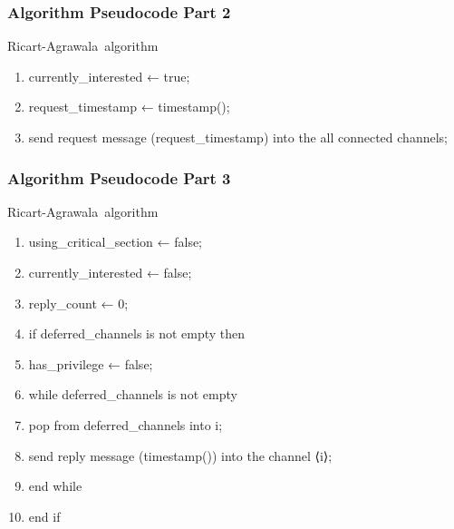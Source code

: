 \documentclass[11pt]{beamer}              %
\begin{document}
\begin{frame}
\frametitle{Algorithm Pseudocode Part 2}

\begin{center}
\begin{algorithm}[H]
	\scriptsize
	\def\algorithmlabel{Ricart-Agrawala}
    \caption{\algorithmlabel\ algorithm}
    \label{alg:ricart_agrawala}
    \begin{algorithmic}[1]
            \begin{enumerate}
                \item currently\_interested ← true;
                \item request\_timestamp ← timestamp();
                \item send request message (request\_timestamp) into the all connected channels;
            \end{enumerate}
    \end{algorithmic}
\end{algorithm}
\end{center}
\end{frame}

\begin{frame}
\frametitle{Algorithm Pseudocode Part 3}

\begin{center}
\begin{algorithm}[H]
	\scriptsize
	\def\algorithmlabel{Ricart-Agrawala}
    \caption{\algorithmlabel\ algorithm}
    \label{alg:ricart_agrawala}
    \begin{algorithmic}[1]
            \begin{enumerate}
                \item using\_critical\_section ← false;
                \item currently\_interested ← false;
                \item reply\_count ← 0;
                \item if deferred\_channels is not empty then
                \item \quad has\_privilege ← false;
                \item \quad while deferred\_channels is not empty
                \item \quad\quad pop from deferred\_channels into i;
                \item \quad\quad send reply message (timestamp()) into the channel ⟨i⟩;
                \item \quad end while
                \item end if
            \end{enumerate}
    \end{algorithmic}
\end{algorithm}
\end{center}
\end{frame}
\end{document}
